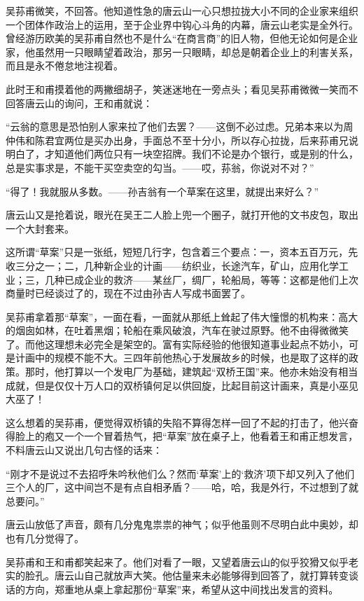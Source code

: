 \par 吴荪甫微笑，不回答。他知道性急的唐云山一心只想拉拢大小不同的企业家来组织一个团体作政治上的运用，至于企业界中钩心斗角的内幕，唐云山老实是全外行。曾经游历欧美的吴荪甫自然也不是什么“在商言商”的旧人物，但他无论如何是企业家，他虽然用一只眼睛望着政治，那另一只眼睛，却总是朝着企业上的利害关系，而且是永不倦怠地注视着。
\par 此时王和甫摸着他的两撇细胡子，笑迷迷地在一旁点头；看见吴荪甫微微一笑而不回答唐云山的询问，王和甫就说：
\par “云翁的意思是恐怕别人家来拉了他们去罢？——这倒不必过虑。兄弟本来以为周仲伟和陈君宜两位是买办出身，手面总不至十分小，所以存心拉拢，后来荪甫兄说明白了，才知道他们两位只有一块空招牌。我们不论是办个银行，或是别的什么，总是实事求是，不能干买空卖空的勾当。——哎，荪翁，你说对不对？”
\par “得了！我就服从多数。——孙吉翁有一个草案在这里，就提出来好么？”
\par 唐云山又是抢着说，眼光在吴王二人脸上兜一个圈子，就打开他的文书皮包，取出一个大封套来。
\par 这所谓“草案”只是一张纸，短短几行字，包含着三个要点：一，资本五百万元，先收三分之一；二，几种新企业的计画——纺织业，长途汽车，矿山，应用化学工业；三，几种已成企业的救济——某丝厂，绸厂，轮船局，等等：这都是他们上次商量时已经谈过了的，现在不过由孙吉人写成书面罢了。
\par 吴荪甫拿着那“草案”，一面在看，一面就从那纸上耸起了伟大憧憬的机构来：高大的烟囱如林，在吐着黑烟；轮船在乘风破浪，汽车在驶过原野。他不由得微微笑了。而他这理想未必完全是架空的。富有实际经验的他很知道事业起点不妨小，可是计画中的规模不能不大。三四年前他热心于发展故乡的时候，也是取了这样的政策。那时，他打算以一个发电厂为基础，建筑起“双桥王国”来。他亦未始没有相当成就，但是仅仅十万人口的双桥镇何足以供回旋，比起目前这计画来，真是小巫见大巫了！
\par 这么想着的吴荪甫，便觉得双桥镇的失陷不算得怎样一回了不起的打击了，他兴奋得脸上的疱又一个一个冒着热气，把“草案”放在桌子上，他看着王和甫正想发言，不料唐云山又说出几句古怪的话来：
\par “刚才不是说过不去招呼朱吟秋他们么？然而‘草案’上的‘救济’项下却又列入了他们三个人的厂，这中间岂不是有点自相矛盾？——哈，哈，我是外行，不过想到了就总要问。”
\par 唐云山放低了声音，颇有几分鬼鬼祟祟的神气；似乎他虽则不尽明白此中奥妙，却也有几分觉得了。
\par 吴荪甫和王和甫都笑起来了。他们对看了一眼，又望着唐云山的似乎狡猾又似乎老实的脸孔。唐云山自己就放声大笑。他估量来未必能够得到回答了，就打算转变谈话的方向，郑重地从桌上拿起那份“草案”来，希望从这中间找出发言的资料。
